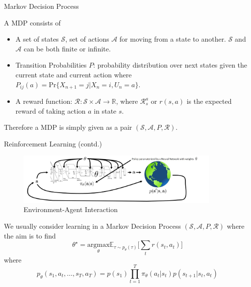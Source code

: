 \documentclass[9pt]{beamer}
\begin{document}
\begin{frame}{Markov Decision Process}
\begin{definition}
A MDP consists of 
\begin{itemize}
    \item A set of states $\mathcal{S}$, set of actions $\mathcal{A}$ for moving from a state to another. $\mathcal{S}$ and $\mathcal{A}$ can be both finite or infinite.
    \item Transition Probabilities $P$: probability distribution over next states given the current state and current action where $P_{ij}(a) = \text{Pr}\{X_{n+1}=j|X_{n}=i,U_n=a\}$.
    \item A reward function: $\mathcal{R}: \mathcal{S}\times\mathcal{A}\rightarrow\mathbb{R}$, where $\mathcal{R}_s^a$ or $r(s,a)$ is the expected reward of taking action $a$ in state $s$.
\end{itemize} 
Therefore a MDP is simply given as a pair $(\mathcal{S},\mathcal{A},P,\mathcal{R})$.\\
\end{definition}
\end{frame}

\begin{frame}{Reinforcement Learning (contd.)}
\begin{figure}[H]
    \centering
    \includegraphics[width=10cm]{images/rl.jpeg}
    \caption{Environment-Agent Interaction}
    \label{fig:my_label}
\end{figure}
We usually consider learning in a Markov Decision Process $(\mathcal{S},\mathcal{A},P,\mathcal{R})$ where the aim is to find
\[\theta^\star = \underset{\theta}{\text{argmax}}\mathbb{E}_{\tau\sim p_\theta(\tau)}\Big[\sum_t r(s_t,a_t)\Big]\]
where 
\[p_\theta(s_1,a_t,\ldots,s_T,a_T)=p(s_1)\prod_{t=1}^T\pi_\theta(a_t|s_t)p(s_{t+1}|s_t,a_t)\]
\end{frame}
\end{document}
